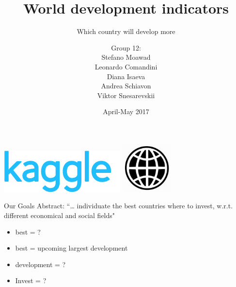 \documentclass[10pt]{beamer}
\title[World development indicators]{\huge World development indicators}
\subtitle[Which country will develop more]{\large Which country will develop more}
\author[Moawad, Commandi, Isaeva, Schiavon, Snesarevskii] {{\Large Group 12:\\}Stefano Moawad\\Leonardo Comandini\\Diana Isaeva\\Andrea Schiavon\\Viktor Snesarevskii}
\date{April-May 2017}
\begin{document}
\begin{frame}
\titlepage
\vfill
\begin{flushright}
\includegraphics[height=.7cm]{kaggle.png}\quad
\includegraphics[height=.7cm]{worldbank.jpg}
\end{flushright}
\end{frame}

\begin{frame}{Our Goals} 
	Abstract: “… individuate the best countries where to invest, w.r.t. different economical and social fields"
	\begin{itemize} [<+->]%
		\item best = ? \\
		\item best = upcoming largest development
		\item development = ?
		\item Invest = ?
	\end{itemize}
\end{frame}
\end{document}
